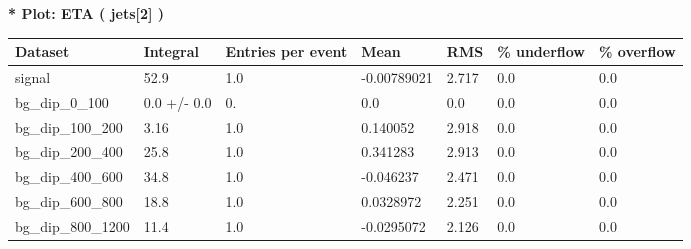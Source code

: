 \documentclass[a4paper, 10pt]{article}
\begin{document}
\textbf{* Plot: ETA ( jets[2] ) }\\
   \begin{table}[H]
  \begin{center}
    \begin{tabular}{|m{23.0mm}|m{23.0mm}|m{18.0mm}|m{19.0mm}|m{19.0mm}|m{19.0mm}|m{19.0mm}|}
      \hline
      {\cellcolor{yellow}         Dataset}& {\cellcolor{yellow}         Integral}& {\cellcolor{yellow}         Entries per event}& {\cellcolor{yellow}         Mean}& {\cellcolor{yellow}         RMS}& {\cellcolor{yellow}         \% underflow}& {\cellcolor{yellow}         \% overflow}\\
      \hline
      {\cellcolor{white}         signal}& {\cellcolor{white}         52.9}& {\cellcolor{white}         1.0}& {\cellcolor{white}         -0.00789021}& {\cellcolor{white}         2.717}& {\cellcolor{green}         0.0}& {\cellcolor{green}         0.0}\\
      \hline
      {\cellcolor{white}         bg\_dip\_0\_100}& {\cellcolor{white}         0.0 +/\-- 0.0}& {\cellcolor{white}         0.}& {\cellcolor{white}         0.0}& {\cellcolor{white}         0.0}& {\cellcolor{green}         0.0}& {\cellcolor{green}         0.0}\\
      \hline
      {\cellcolor{white}         bg\_dip\_100\_200}& {\cellcolor{white}         3.16}& {\cellcolor{white}         1.0}& {\cellcolor{white}         0.140052}& {\cellcolor{white}         2.918}& {\cellcolor{green}         0.0}& {\cellcolor{green}         0.0}\\
      \hline
      {\cellcolor{white}         bg\_dip\_200\_400}& {\cellcolor{white}         25.8}& {\cellcolor{white}         1.0}& {\cellcolor{white}         0.341283}& {\cellcolor{white}         2.913}& {\cellcolor{green}         0.0}& {\cellcolor{green}         0.0}\\
      \hline
      {\cellcolor{white}         bg\_dip\_400\_600}& {\cellcolor{white}         34.8}& {\cellcolor{white}         1.0}& {\cellcolor{white}         -0.046237}& {\cellcolor{white}         2.471}& {\cellcolor{green}         0.0}& {\cellcolor{green}         0.0}\\
      \hline
      {\cellcolor{white}         bg\_dip\_600\_800}& {\cellcolor{white}         18.8}& {\cellcolor{white}         1.0}& {\cellcolor{white}         0.0328972}& {\cellcolor{white}         2.251}& {\cellcolor{green}         0.0}& {\cellcolor{green}         0.0}\\
      \hline
      {\cellcolor{white}         bg\_dip\_800\_1200}& {\cellcolor{white}         11.4}& {\cellcolor{white}         1.0}& {\cellcolor{white}         -0.0295072}& {\cellcolor{white}         2.126}& {\cellcolor{green}         0.0}& {\cellcolor{green}         0.0}\\

\end{tabular}
\end{center}
\end{table}
\end{document}
